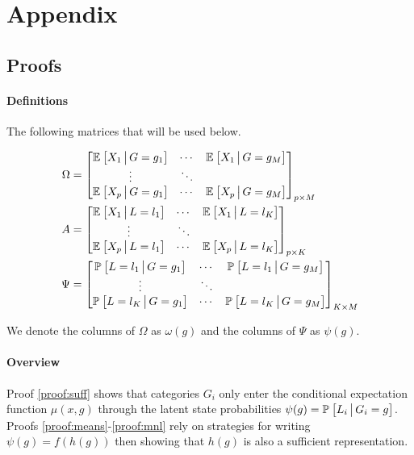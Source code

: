 \documentclass{article}
\theoremstyle{plain}
\theoremstyle{definition}
\theoremstyle{remark}
\begin{document}
\clearpage
\section{Appendix}
\setlength{\parindent}{0pt}

\subsection{Proofs}

\paragraph{Definitions} The following matrices that will be used below.

\begin{align}
    \Omega &=
    \begin{bmatrix}
        \mathbb{E}_{}\left[X_{1} \,\big|\, G=g_{1}\right] & \cdots & \mathbb{E}_{}\left[X_{1} \,\big|\, G=g_{M}\right] \\
                \vdots     &  \ddots &  \\
        \mathbb{E}_{}\left[X_{p} \,\big|\, G=g_{1}\right] & \cdots & \mathbb{E}_{}\left[X_{p} \,\big|\, G=g_{M}\right] \\
    \end{bmatrix}_{p\times M}
    \label{eq:matrix_omega}
\\
    A &=
    \begin{bmatrix}
        \mathbb{E}_{}\left[X_{1} \,\big|\, L=l_{1}\right] & \cdots & \mathbb{E}_{}\left[X_{1} \,\big|\, L=l_{K}\right] \\
                \vdots     &  \ddots &  \\
        \mathbb{E}_{}\left[X_{p} \,\big|\, L=l_{1}\right] & \cdots & \mathbb{E}_{}\left[X_{p} \,\big|\, L=l_{K}\right] \\
    \end{bmatrix}_{p\times K}
    \label{eq:matrix_a}
\\
    \Psi &=
    \begin{bmatrix}
        \mathbb{P}_{}\left[L = l_{1} \,\big|\, G=g_{1}\right] & \cdots & \mathbb{P}_{}\left[L = l_{1} \,\big|\, G=g_{M}\right] \\
                \vdots     &  \ddots &  \\
        \mathbb{P}_{}\left[L = l_{K} \,\big|\, G=g_{1}\right] & \cdots & \mathbb{P}_{}\left[ L = l_{K} \,\big|\, G=g_{M}\right] \\
    \end{bmatrix}_{K\times M}
    \label{eq:matrix_psi}
\end{align}

We denote the columns of $\Omega$ as $\omega(g)$ and the columns of $\Psi$ as $\psi(g)$.

\paragraph{Overview} Proof \ref{proof:suff} shows that categories $G_{i}$ only enter the conditional expectation function $\mu(x, g)$ through the latent state probabilities $\psi(g) = \mathbb{P}_{}\left[L_{i} \,\big|\, G_{i} = g\right]$. Proofs \ref{proof:means}-\ref{proof:mnl} rely on strategies for writing $\psi(g) = f(h(g))$ then showing that $h(g)$ is also a sufficient representation.
\end{document}
